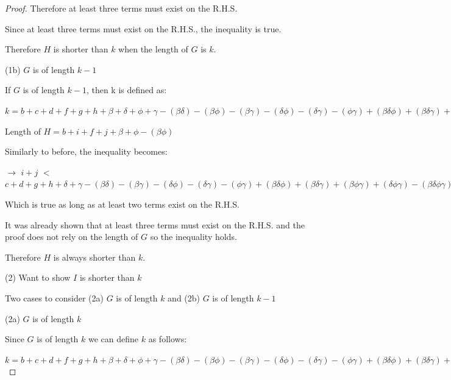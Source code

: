 \documentclass[manuscript]{acmart}
\begin{document}
\begin{proof}
        Therefore at least three terms must exist on the R.H.S.

        Since at least three terms must exist on the R.H.S., the inequality is true.

        Therefore $H$ is shorter than $k$ when the length of $G$ is $k$.

        (1b) $G$ is of length $k - 1$

        If $G$ is of length $k - 1$, then k is defined as:

        $k = b + c + d + f + g + h
            + \beta + \delta + \phi + \gamma
            - (\beta \delta) - (\beta \phi) - (\beta \gamma) - (\delta \phi) - (\delta \gamma) -(\phi \gamma)
            + (\beta \delta \phi) + (\beta \delta \gamma) + (\beta \phi \gamma) + (\delta \phi \gamma)
            - (\beta \delta \phi \gamma)
            + 1
        $

        Length of $H = b + i + f + j + \beta + \phi - (\beta \phi)$

        Similarly to before, the inequality becomes:

        $\rightarrow$
        $i + j$
        $<$
        $c + d + g + h
            + \delta + \gamma
            - (\beta \delta) - (\beta \gamma) - (\delta \phi) - (\delta \gamma) -(\phi \gamma)
            + (\beta \delta \phi) + (\beta \delta \gamma) + (\beta \phi \gamma) + (\delta \phi \gamma)
            - (\beta \delta \phi \gamma)
            + 1
            $

        Which is true as long as at least two terms exist on the R.H.S.

        It was already shown that at least three terms must exist on the R.H.S. and the proof does not rely on the length of $G$ so the inequality holds.

        Therefore $H$ is always shorter than $k$. 

        (2) Want to show $I$ is shorter than $k$

        Two cases to consider (2a) $G$ is of length $k$ and (2b) $G$ is of length $k - 1$

        (2a) $G$ is of length $k$

        Since $G$ is of length $k$ we can define $k$ as follows:

        $k = b + c + d + f + g + h
            + \beta + \delta + \phi + \gamma
            - (\beta \delta) - (\beta \phi) - (\beta \gamma) - (\delta \phi) - (\delta \gamma) -(\phi \gamma)
            + (\beta \delta \phi) + (\beta \delta \gamma) + (\beta \phi \gamma) + (\delta \phi \gamma)
            - (\beta \delta \phi \gamma)
        $


\end{proof}
\end{document}
